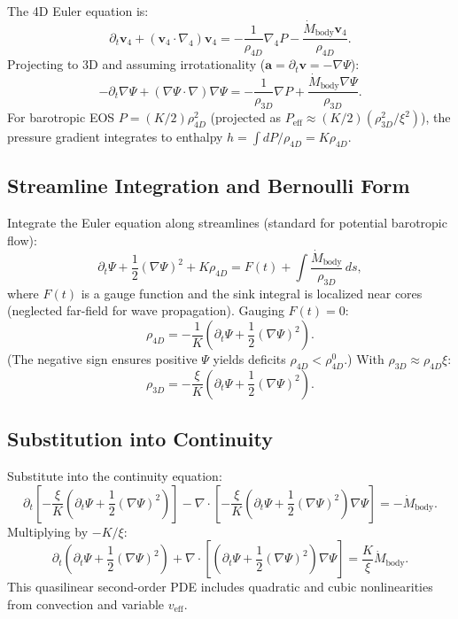 The 4D Euler equation is:
\[
\partial_t \mathbf{v}_4 + (\mathbf{v}_4 \cdot \nabla_4) \mathbf{v}_4 = -\frac{1}{\rho_{4D}} \nabla_4 P - \frac{\dot{M}_{\text{body}} \mathbf{v}_4}{\rho_{4D}}.
\]
Projecting to 3D and assuming irrotationality ($\mathbf{a} = \partial_t \mathbf{v} = -\nabla \Psi$):
\[
-\partial_t \nabla \Psi + (\nabla \Psi \cdot \nabla) \nabla \Psi = -\frac{1}{\rho_{3D}} \nabla P + \frac{\dot{M}_{\text{body}} \nabla \Psi}{\rho_{3D}}.
\]
For barotropic EOS $P = (K/2) \rho_{4D}^2$ (projected as $P_{\text{eff}} \approx (K/2) (\rho_{3D}^2 / \xi^2)$), the pressure gradient integrates to enthalpy $h = \int dP / \rho_{4D} = K \rho_{4D}$.

\subsection{Streamline Integration and Bernoulli Form}

Integrate the Euler equation along streamlines (standard for potential barotropic flow):
\[
\partial_t \Psi + \frac{1}{2} (\nabla \Psi)^2 + K \rho_{4D} = F(t) + \int \frac{\dot{M}_{\text{body}}}{\rho_{3D}} \, ds,
\]
where $F(t)$ is a gauge function and the sink integral is localized near cores (neglected far-field for wave propagation). Gauging $F(t) = 0$:
\[
\rho_{4D} = -\frac{1}{K} \left( \partial_t \Psi + \frac{1}{2} (\nabla \Psi)^2 \right).
\]
(The negative sign ensures positive $\Psi$ yields deficits $\rho_{4D} < \rho_{4D}^0$.) With $\rho_{3D} \approx \rho_{4D} \xi$:
\[
\rho_{3D} = -\frac{\xi}{K} \left( \partial_t \Psi + \frac{1}{2} (\nabla \Psi)^2 \right).
\]

\subsection{Substitution into Continuity}

Substitute into the continuity equation:
\[
\partial_t \left[ -\frac{\xi}{K} \left( \partial_t \Psi + \frac{1}{2} (\nabla \Psi)^2 \right) \right] - \nabla \cdot \left[ -\frac{\xi}{K} \left( \partial_t \Psi + \frac{1}{2} (\nabla \Psi)^2 \right) \nabla \Psi \right] = -\dot{M}_{\text{body}}.
\]
Multiplying by $-K / \xi$:
\[
\partial_t \left( \partial_t \Psi + \frac{1}{2} (\nabla \Psi)^2 \right) + \nabla \cdot \left[ \left( \partial_t \Psi + \frac{1}{2} (\nabla \Psi)^2 \right) \nabla \Psi \right] = \frac{K}{\xi} \dot{M}_{\text{body}}.
\]
This quasilinear second-order PDE includes quadratic and cubic nonlinearities from convection and variable $v_{\text{eff}}$.

